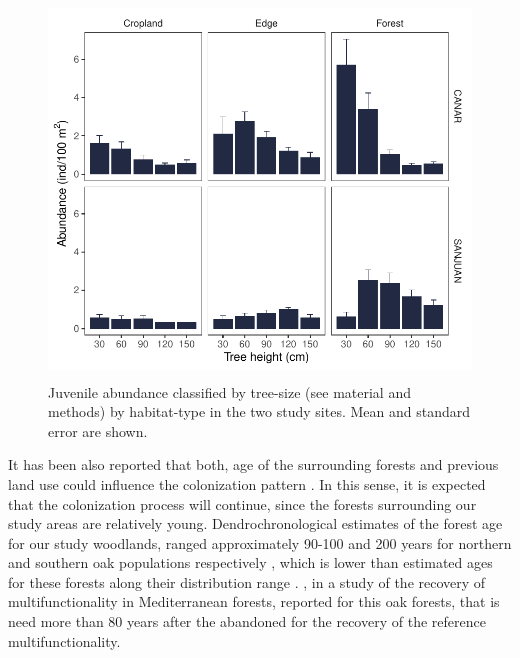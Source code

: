 \begin{figure}
    \centering
    \includegraphics[width=\textwidth,height=10cm,
  keepaspectratio]{img/coloniza/coloniza-TreeCategory.pdf}
    \caption{Juvenile abundance classified by tree-size (see material and methods) by habitat-type in the two study sites. Mean and standard error are shown.}
    \label{fig:coloniza:treeCategory}
\end{figure}

It has been also reported that both, age of the surrounding forests and previous land use could influence the colonization pattern \autocite{MinottaDegioanni2011NaturallyRegenerated}. In this sense, it is expected that the colonization process will continue, since the forests surrounding our study areas are relatively young. Dendrochronological estimates of the forest age for our study woodlands, ranged approximately 90-100 and 200 years for northern and southern oak populations respectively \autocite{PerezLuqueetal2020LanduseLegacies, GeaIzquierdoCanellas2014LocalClimate}, which is lower than estimated ages for these forests along their distribution range \autocites{GeaIzquierdoCanellas2014LocalClimate}. \citet{CruzAlonsoetal2019LongTerm}, in a study of the recovery of multifunctionality in Mediterranean forests, reported for this oak forests, that is need more than 80 years after the abandoned for the recovery of the reference multifunctionality. 

